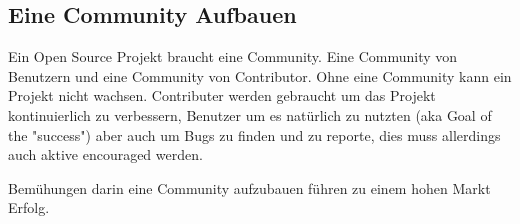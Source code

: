 \subsection{Eine Community Aufbauen} \label{ssec:Eine Community Aufbauen}

Ein Open Source Projekt braucht eine Community.
Eine Community von Benutzern und eine Community von Contributor. Ohne eine Community kann ein Projekt
nicht wachsen. Contributer werden gebraucht um das Projekt kontinuierlich zu verbessern, Benutzer um
es natürlich zu nutzten (aka Goal of the "success") aber auch um Bugs zu finden und zu reporte,
dies muss allerdings auch aktive encouraged werden. \cite{bangerthWhatMakesComputational2013}

\begin{hypothesis}
    Bemühungen darin eine Community aufzubauen führen zu einem hohen Markt Erfolg.
\end{hypothesis}